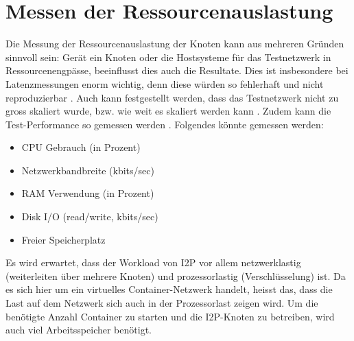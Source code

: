 \section{Messen der Ressourcenauslastung}\label{sec:ressourcenauslastung}


Die Messung der Ressourcenauslastung der Knoten kann aus mehreren Gründen sinnvoll sein:
Gerät ein Knoten oder die Hostsysteme für das Testnetzwerk in Ressourcenengpässe, beeinflusst dies auch die Resultate.
Dies ist insbesondere bei Latenzmessungen enorm wichtig, denn diese würden so fehlerhaft und nicht reproduzierbar .
Auch kann festgestellt werden, dass das Testnetzwerk nicht zu gross skaliert wurde, bzw. wie weit es skaliert werden kann .
Zudem kann die Test-Performance so gemessen werden .
Folgendes könnte gemessen werden:

\begin{itemize}
    \item CPU Gebrauch (in Prozent)
    \item Netzwerkbandbreite (kbits/sec)
    \item RAM Verwendung (in Prozent)
    \item Disk I/O (read/write, kbits/sec)
    \item Freier Speicherplatz
\end{itemize}

Es wird erwartet, dass der Workload von I2P vor allem netzwerklastig (weiterleiten über mehrere Knoten) und prozessorlastig (Verschlüsselung) ist.
Da es sich hier um ein virtuelles Container-Netzwerk handelt, heisst das, dass die Last auf dem Netzwerk sich auch in der Prozessorlast zeigen wird.
Um die benötigte Anzahl Container zu starten und die I2P-Knoten zu betreiben, wird auch viel Arbeitsspeicher benötigt.
